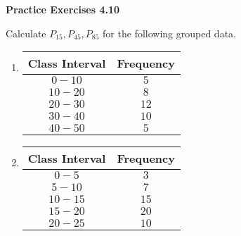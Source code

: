\vspace{0.3ex}
\noindent\textbf{Practice Exercises 4.10}

\vspace{0.2ex}

Calculate \(P_{15}, P_{45}, P_{85}\) for the following grouped data.  
\begin{multicols}{2}
\begin{enumerate}
    \item 
    \begin{tabular}{|c|c|}
        \hline
        Class Interval & Frequency \\ \hline
        \(0 - 10\) & \(5\) \\ \hline
        \(10 - 20\) & \(8\) \\ \hline
        \(20 - 30\) & \(12\) \\ \hline
        \(30 - 40\) & \(10\) \\ \hline
        \(40 - 50\) & \(5\) \\ \hline
    \end{tabular}
    \item 
    \begin{tabular}{|c|c|}
        \hline
        Class Interval & Frequency \\ \hline
        \(0 - 5\) & \(3\) \\ \hline
        \(5 - 10\) & \(7\) \\ \hline
        \(10 - 15\) & \(15\) \\ \hline
        \(15 - 20\) & \(20\) \\ \hline
        \(20 - 25\) & \(10\) \\ \hline
    \end{tabular}
    \end{enumerate}
 \end{multicols}
